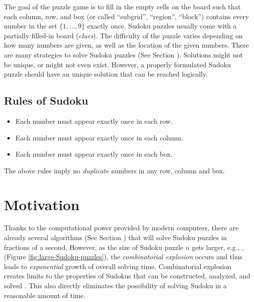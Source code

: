 \documentclass[12pt,a4paper]{article}
\begin{document}
	The goal of the puzzle game is to fill in the empty cells on the board such that each column,
	row, and box (or called ``subgrid'', ``region'', ``block'') contains every number in the set $\{1, ... , 9\}$ exactly once.
	Sudoku puzzles usually come with a partially filled-in board (\textit{clues}).
	The difficulty of the puzzle varies depending on how many numbers are given, as well as the location of the given numbers.
	There are many strategies to solve Sudoku puzzles (See Section ).
	Solutions might not be unique, or might not even exist.
	However, a properly formulated Sudoku puzzle should have an unique solution that can be reached logically.
	
	\subsection{Rules of Sudoku} \label{sec:rules}
	\begin{itemize}[itemsep=0pt, parsep=0pt]
		\item Each number must appear exactly once in each row.
		\item Each number must appear exactly once in each column.
		\item Each number must appear exactly once in each box.
	\end{itemize}
	
	The above rules imply no \textit{duplicate} numbers in any row, column and box.


\newpage %
\section{Motivation}
Thanks to the computational power provided by modern computers, there are already several algorithms (See Section )
that will solve  Sudoku puzzles in fractions of a second.
However, as the size of Sudoku puzzle $n$ gets larger, e.g.,
,  (Figure \ref{fig:large-Sudoku-puzzles}),
the \textit{combinatorial explosion} occurs and thus leads to \textit{exponential} growth of overall solving time.
Combinatorial explosion creates limits to the properties of Sudokus that can be constructed, analyzed, and solved \cite{wiki:combinatorial-exploration}. 
This also directly eliminates the possibility of solving Sudoku in a reasonable amount of time.
\end{document}
